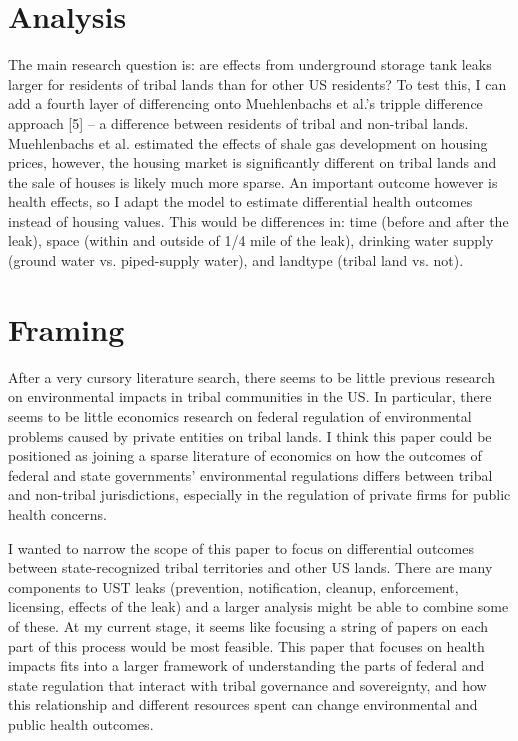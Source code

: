 \documentclass[12pt]{article}
\begin{document}
\section{Analysis}
The main research question is: are effects from underground storage tank leaks larger for residents of tribal lands than for other US residents? To test this, I can add a fourth layer of differencing onto Muehlenbachs et al.'s tripple difference approach [5] -- a difference between residents of tribal and non-tribal lands. Muehlenbachs et al. estimated the effects of shale gas development on housing prices, however, the housing market is significantly different on tribal lands and the sale of houses is likely much more sparse. An important outcome however is health effects, so I adapt the model to estimate differential health outcomes instead of housing values. This would be differences in: time (before and after the leak), space (within and outside of 1/4 mile of the leak), drinking water supply (ground water vs. piped-supply water), and landtype (tribal land vs. not). 



\section{Framing}
After a very cursory literature search, there seems to be little previous research on environmental impacts in tribal communities in the US. In particular, there seems to be little economics research on federal regulation of environmental problems caused by private entities on tribal lands. I think this paper could be positioned as joining a sparse literature of economics on how the outcomes of federal and state governments' environmental regulations differs between tribal and non-tribal jurisdictions, especially in the regulation of private firms for public health concerns.

I wanted to narrow the scope of this paper to focus on differential outcomes between state-recognized tribal territories and other US lands. There are many components to UST leaks (prevention, notification, cleanup, enforcement, licensing, effects of the leak) and a larger analysis might be able to combine some of these. At my current stage, it seems like focusing a string of papers on each part of this process would be most feasible. This paper that focuses on health impacts fits into a larger framework of understanding the parts of federal and state regulation that interact with tribal governance and sovereignty, and how this relationship and different resources spent can change environmental and public health outcomes.
\end{document}
